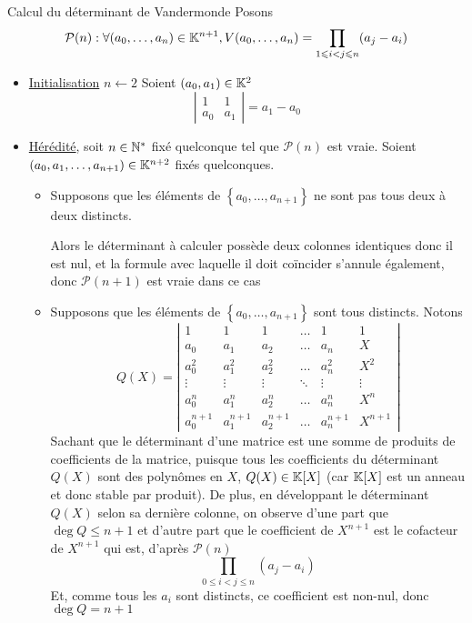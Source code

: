 \documentclass{article}
\renewenvironment{question_kholle}[2][ ]
{
	\subsection{\texorpdfstring{#2}{}}
	\notblank{#1}
	{
		\noindent #1
		\bigbreak
	}
	{}
	\begin{proof}
}
{
	\end{proof}
}
\begin{document}
\begin{question_kholle}{Calcul du déterminant de Vandermonde}
Posons
    $$
\mathcal{P}(n) : \forall (a_{0},\dots,a_{n}) \in \mathbb K^{n+1}, V(a_{0}, \dots, a_{n}) = \prod_{1\leqslant i < j \leqslant n}(a_{j} - a_{i})
$$
\begin{itemize}[label=$\lozenge$]
    \item \underline{Initialisation} $n \leftarrow 2$
Soient $(a_{0}, a_{1}) \in \mathbb K^{2}$
$$
\left| \begin{matrix}
1 & 1 \\
a_{0} & a_{1}
\end{matrix}\right| = a_{1} - a_{0}
$$



\item \underline{Hérédité}, soit $n \in \mathbb N^{*}$ fixé quelconque tel que $\mathcal{P}(n)$ est vraie.
Soient $(a_{0}, a_{1}, \dots, a_{n+1}) \in \mathbb K^{n+2}$ fixés quelconques.
\begin{itemize}
    \item Supposons que les éléments de $\left\{ a_{0}, \dots, a_{n+1} \right\}$ ne sont pas tous deux à deux distincts.
    
    Alors le déterminant à calculer possède deux colonnes identiques donc il est nul, et la formule avec laquelle il doit coïncider s'annule également, donc $\mathcal{P}(n+1)$ est vraie dans ce cas

    \item Supposons que les éléments de $\left\{ a_{0} ,\dots, a_{n+1} \right\}$ sont tous distincts.
Notons
$$
Q(X) = \left| \begin{matrix}
1 & 1 & 1 & \dots  & 1 & 1 \\
a_{0} & a_{1} & a_{2} & \dots & a_{n} & X \\
a_{0}^{2} & a_{1}^{2} & a_{2}^{2} & \dots & a_{n}^{2} & X^{2} \\
\vdots & \vdots & \vdots & \ddots & \vdots & \vdots \\
a_{0}^{n} & a_{1}^{n} & a_{2}^{n} & \dots & a_{n}^{n} & X^{n} \\
a_{0}^{n+1} & a_{1}^{n+1} & a_{2}^{n+1} & \dots & a_{n}^{n+1} & X^{n+1}
\end{matrix} \right| 
$$
Sachant que le déterminant d'une matrice est une somme de produits de coefficients de la matrice, puisque tous les coefficients du déterminant $Q(X)$ sont des polynômes en $X$, $Q(X) \in \mathbb K[X]$ (car $\mathbb K[X]$ est un anneau et donc stable par produit).
De plus, en développant le déterminant $Q(X)$ selon sa dernière colonne, on observe d'une part que $\deg Q \leqslant n+1$ et d'autre part que le coefficient de $X^{n+1}$ est le cofacteur de $X^{n+1}$ qui est, d'après $\mathcal{P}(n)$
$$
\prod_{0\leqslant i<j \leqslant n}(a_{j}-a_{i})
$$
Et, comme tous les $a_{i}$ sont distincts, ce coefficient est non-nul, donc $\deg Q=n+1$


\end{itemize}
\end{itemize}
\end{question_kholle}
\end{document}
